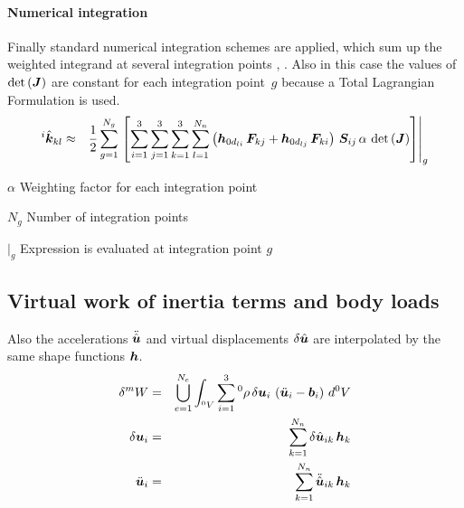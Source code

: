 \paragraph{Numerical integration}
Finally standard numerical integration schemes are applied, which sum up the weighted integrand at several integration points \cite{BATHE2016}, \cite{KUEBLER2005}.
Also in this case the values of $\det{\left(\bm{J}\right)}$ are constant for each integration point~$g$ because a Total Lagrangian Formulation is used.
\begin{eqnarray}
^i\hat{\bm{k}}_{kl} & \approx & \frac{1}{2} \sum_{g=1}^{N_g} \left.\left[ \sum_{i=1}^3 \sum_{j=1}^3 \sum_{k=1}^3 \sum_{l=1}^{N_n} \left(\bm{h}_{0d_{li}} \, \bm{F}_{kj} + \bm{h}_{0d_{lj}} \, \bm{F}_{ki}\right) \, \bm{S}_{ij}  \, \alpha \, \det{\left(\bm{J}\right)}\right]\right\vert_{g}
\end{eqnarray}
\begin{description}
\item{$\alpha$} Weighting factor for each integration point
\item{$N_g$} Number of integration points
\item{$\vert_g$} Expression is evaluated at integration point $g$
\end{description}

\subsection{Virtual work of inertia terms and body loads}
Also the accelerations $\ddot{\hat{\bm{u}}}$ and virtual displacements $\delta\hat{\bm{u}}$ are interpolated by the same shape functions $\bm{h}$.
\begin{eqnarray}
\delta^{m}W & = & \bigcup_{e=1}^{N_e} \int_{^0V} \sum_{i=1}^3 {^0}\rho \, \delta\bm{u}_i \, \left(\ddot{\bm{u}}_i - \bm{b}_i\right) \, d^0V \label{eq:solid:delta_Wm} \\
\delta\bm{u}_i & = & \sum_{k=1}^{N_n} \delta\hat{\bm{u}}_{ik} \, \bm{h}_k \label{eq:solid:delta_u} \\
\ddot{\bm{u}}_i & = & \sum_{k=1}^{N_n} \ddot{\hat{\bm{u}}}_{ik} \, \bm{h}_k \label{eq:solid:delta_ddotu}
\end{eqnarray}

